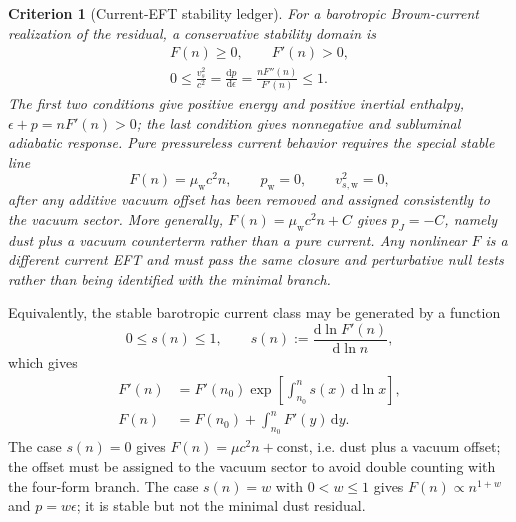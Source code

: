 \documentclass[
  aps,
  prd,
  reprint,
  superscriptaddress,
  floatfix,
  nofootinbib,
  longbibliography
]{revtex4-2}
\theoremstyle{plain}
\newtheorem{criterion}[theorem]{Criterion}
\theoremstyle{definition}
\theoremstyle{remark}
\newcommand{\dd}{\mathrm d}
\newcommand{\wind}{\mathrm w}
\newcommand{\eps}{\epsilon}
\begin{document}
\begin{criterion}[Current-EFT stability ledger]
For a barotropic Brown-current realization of the residual, a conservative
stability domain is
\begin{equation}
\begin{gathered}
F(n)\ge0,
\qquad
F'(n)>0,\\
0\le \frac{v_s^2}{c^2}=\frac{\dd p}{\dd\eps}=
\frac{nF''(n)}{F'(n)}\le1 .
\end{gathered}
\label{eq:current_stability_v13}
\end{equation}
The first two conditions give positive energy and positive inertial enthalpy,
\(\eps+p=nF'(n)>0\); the last condition gives nonnegative and subluminal
adiabatic response.  Pure pressureless current behavior requires the special stable line
\begin{equation}
F(n)=\mu_{\wind}c^2n,
\qquad
p_{\wind}=0,
\qquad
v_{s,\wind}^2=0,
\label{eq:linear_current_line_v13}
\end{equation}
after any additive vacuum offset has been removed and assigned consistently to
the vacuum sector.  More generally, \(F(n)=\mu_{\wind}c^2n+C\) gives \(p_J=-C\),
namely dust plus a vacuum counterterm rather than a pure current.  Any nonlinear
\(F\) is a different current EFT and must pass the same closure and perturbative
null tests rather than being identified with the minimal branch.
\end{criterion}

Equivalently, the stable barotropic current class may be generated by a function
\begin{equation}
0\le s(n)\le1,\qquad
s(n):=\frac{\dd\ln F'(n)}{\dd\ln n},
\end{equation}
which gives
\begin{align}
F'(n)&=F'(n_0)
\exp\!\left[\int_{n_0}^{n}s(x)\,\dd\ln x\right],\\
F(n)&=F(n_0)+\int_{n_0}^{n}F'(y)\,\dd y .
\end{align}
The case $s(n)=0$ gives $F(n)=\mu c^2n+\mathrm{const}$, i.e. dust plus a
vacuum offset; the offset must be assigned to the vacuum sector to avoid double
counting with the four-form branch.  The case $s(n)=w$ with $0<w\le1$ gives
$F(n)\propto n^{1+w}$ and $p=w\eps$; it is stable but not the minimal dust
residual.
\end{document}
